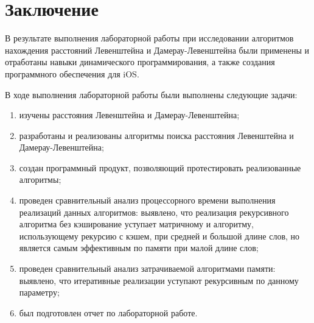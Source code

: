 \chapter*{Заключение}

В результате выполнения лабораторной работы при исследовании алгоритмов нахождения расстояний Левенштейна и Дамерау-Левенштейна были применены и отработаны навыки динамического программирования, а также создания программного обеспечения для iOS.

В ходе выполнения лабораторной работы были выполнены следующие задачи: 
\begin{enumerate}[label={\arabic*)}]
	\item изучены расстояния Левенштейна и Дамерау-Левенштейна;
	\item разработаны и реализованы алгоритмы поиска расстояния Левенштейна и Дамерау-Левенштейна;
	\item создан программный продукт, позволяющий протестировать реализованные алгоритмы;
	\item проведен сравнительный анализ процессорного времени выполнения реализаций данных алгоритмов: выявлено, что реализация рекурсивного алгоритма без кэширование уступает матричному и алгоритму, использующему рекурсию с кэшем, при средней и большой длине слов, но является самым эффективным по памяти при малой длине слов;
	\item проведен сравнительный анализ затрачиваемой алгоритмами памяти: выявлено, что итеративные реализации уступают рекурсивным по данному параметру;
	\item был подготовлен отчет по лабораторной работе.
\end{enumerate}

